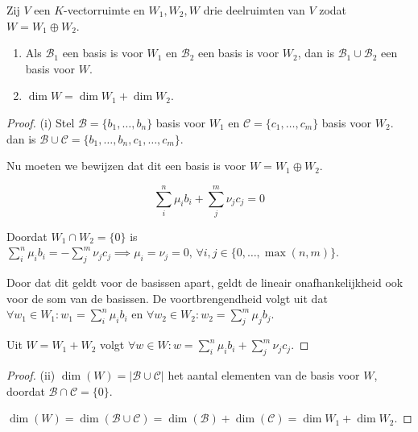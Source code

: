 \begin{stelling}[2.5.4]
    Zij $V$ een $K$-vectorruimte en $W_1, W_2, W$ drie deelruimten van $V$ zodat $W = W_1 \oplus W_2$.
    \begin{enumerate}
        \item[(i)] Als $\mathcal{B}_1$ een basis is voor $W_1$ en $\mathcal{B}_2$ een basis is voor $W_2$, dan is $\mathcal{B}_1 \cup \mathcal{B}_2$ een basis voor $W$.
        \item[(ii)] $\dim W = \dim W_1 + \dim W_2$.
    \end{enumerate}
\end{stelling}
\begin{proof}(i)
    Stel \(\mathcal{B} = \{b_1, \dots, b_n\}\) basis voor \(W_1\) en \(\mathcal{C} = \{c_1, \dots, c_m\}\) basis voor \(W_2\).
    dan is \(\mathcal{B} \cup \mathcal{C} = \{b_1, \dots, b_n,c_1, \dots, c_m\}\).

    Nu moeten we bewijzen dat dit een basis is voor \(W = W_1 \oplus W_2\).

    \[\sum_{i}^{n} \mu_i b_i + \sum_{j}^{m} \nu_j c_j  = 0\]

    Doordat \(W_1 \cap W_2 = \{0\}\) is \(\sum_{i}^{n} \mu_i b_i = -\sum_{j}^{m} \nu_j c_j \implies \mu_i = \nu_j = 0 , \,\forall i,j \in \{0,\dots,\max(n,m)\} \).

    Door dat dit geldt voor de basissen apart, geldt de lineair onafhankelijkheid ook voor de som van de basissen.
    De voortbrengendheid volgt uit dat \(\forall w_1 \in W_1: w_{1} = \sum_{i}^{n} \mu_i b_i \) en
     \(\forall w_2 \in W_2: w_{2} = \sum_{j}^{m} \mu_j b_j \).

    Uit \(W = W_1 + W_2\) volgt \(\forall w \in W: w = \sum_{i}^{n} \mu_i b_i + \sum_{j}^{m} \nu_j c_j\).
\end{proof}
\begin{proof}(ii)
    \(\dim(W)= |\mathcal{B} \cup \mathcal{C}| \) het aantal elementen van de basis voor \(W\), doordat \(\mathcal{B} \cap \mathcal{C} = \{0\}\).

    \(\dim(W)=  \dim(\mathcal{B} \cup \mathcal{C}) = \dim(\mathcal{B}) + \dim(\mathcal{C}) = \dim W_1 + \dim W_2. \)
\end{proof}

